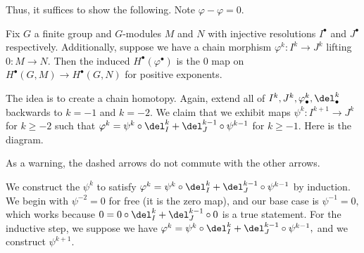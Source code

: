 Thus, it suffices to show the following. Note $\varphi-\varphi=0.$
\begin{lemma}
    Fix $G$ a finite group and $G$-modules $M$ and $N$ with injective resolutions $I^\bullet$ and $J^\bullet$ respectively. Additionally, suppose we have a chain morphism $\varphi^k:I^k\to J^k$ lifting $0:M\to N.$ Then the induced $H^\bullet\left(\varphi^\bullet\right)$ is the $0$ map on $H^\bullet(G,M)\to H^\bullet(G,N)$ for positive exponents.
\end{lemma}
The idea is to create a chain homotopy. Again, extend all of $I^k,J^k,\varphi^k_\bullet,\del_\bullet^k$ backwards to $k=-1$ and $k=-2.$ We claim that we exhibit maps $\psi^k:I^{k+1}\to J^k$ for $k\ge-2$ such that $\varphi^k=\psi^k\circ\del_I^k+\del_J^{k-1}\circ\psi^{k-1}$ for $k\ge-1.$ Here is the diagram.
\begin{center}
\end{center}
As a warning, the dashed arrows do not commute with the other arrows.

We construct the $\psi^k$ to satisfy $\varphi^k=\psi^k\circ\del_I^k+\del_J^{k-1}\circ\psi^{k-1}$ by induction. We begin with $\psi^{-2}=0$ for free (it is the zero map), and our base case is $\psi^{-1}=0,$ which works because $0=0\circ\del_I^k+\del_J^{k-1}\circ0$ is a true statement. For the inductive step, we suppose we have $\varphi^k=\psi^k\circ\del_I^k+\del_J^{k-1}\circ\psi^{k-1},$ and we construct $\psi^{k+1}.$

